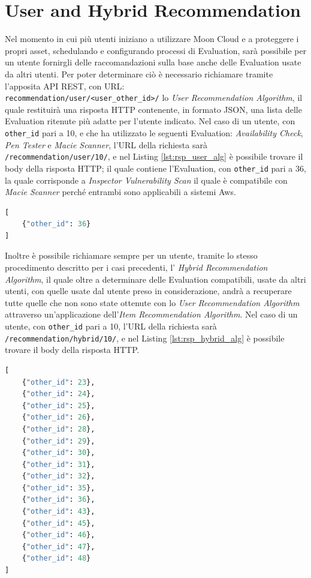\section*{User and Hybrid Recommendation}
Nel momento in cui più utenti iniziano a utilizzare Moon Cloud e a proteggere i propri asset, schedulando e configurando 
processi di Evaluation, sarà possibile per un utente fornirgli delle raccomandazioni sulla base anche delle Evaluation usate da 
altri utenti. Per poter determinare ciò è necessario richiamare tramite l'apposita API REST, con URL: \\
\texttt{recommendation/user/<user\_other\_id>/} lo \textit{User Recommendation Algorithm}, il quale restituirà una 
risposta HTTP contenente, in formato JSON, una lista delle Evaluation ritenute più adatte per l'utente indicato. 
Nel caso di un utente, con \texttt{other\_id} pari a 10, e che ha utilizzato le seguenti Evaluation: \textit{Availability Check},
\textit{Pen Tester} e \textit{Macie Scanner}, l'URL della richiesta sarà 
\texttt{/recommendation/user/10/}, e nel Listing \ref{lst:rsp_user_alg} è possibile trovare il body della risposta HTTP; il quale 
contiene l'Evaluation, con \texttt{other\_id} pari a 36, la quale corrisponde a \textit{Inspector Vulnerability Scan} il quale 
è compatibile con \textit{Macie Scanner} perché entrambi sono applicabili a sistemi Aws.
\begin{lstlisting}[language=Python, label=lst:rsp_user_alg, caption={Esempio di risposta HTTP alla chiamata del 
    \textit{User Recommendation Algorithm}}]
[
    {"other_id": 36}
]
\end{lstlisting}
Inoltre è possibile richiamare sempre per un utente, tramite lo stesso procedimento descritto per i casi precedenti, 
l' \textit{Hybrid Recommendation Algorithm}, il quale oltre a determinare delle Evaluation compatibili, usate da altri 
utenti, con quelle usate dal utente preso in considerazione, andrà a recuperare tutte quelle che non sono state ottenute con lo
\textit{User Recommendation Algorithm} attraverso un'applicazione dell'\textit{Item Recommendation Algorithm}. Nel caso di 
un utente, con \texttt{other\_id} pari a 10, l'URL della richiesta sarà 
\texttt{/recommendation/hybrid/10/}, e nel Listing \ref{lst:rsp_hybrid_alg} è possibile trovare il body della risposta HTTP.
\begin{lstlisting}[language=Python, label=lst:rsp_hybrid_alg, caption={Esempio di risposta HTTP alla chiamata del 
    \textit{Hybrid Recommendation Algorithm}}]
[
    {"other_id": 23},
    {"other_id": 24},
    {"other_id": 25},
    {"other_id": 26},
    {"other_id": 28},
    {"other_id": 29},
    {"other_id": 30},
    {"other_id": 31},
    {"other_id": 32},
    {"other_id": 35},
    {"other_id": 36},
    {"other_id": 43},
    {"other_id": 45},
    {"other_id": 46},
    {"other_id": 47},
    {"other_id": 48}
]
\end{lstlisting}
